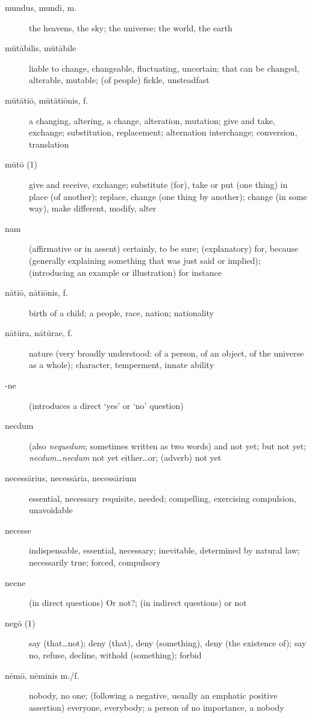 \begin{description}
    \item[mundus, mundī, m.] \marginnote{*}the heavens, the sky; the universe; the world, the earth
    \item[mūtābilis, mūtābile] liable to change, changeable, fluctuating, uncertain; that can be changed, alterable, mutable; (of people) fickle, unsteadfast
    \item[mūtātiō, mūtātiōnis, f.] a changing, altering, a change, alteration, mutation; give and take, exchange; substitution, replacement; alternation interchange; conversion, translation
    \item[mūtō (1)] \marginnote{*}give and receive, exchange; substitute (for), take or put (one thing) in place (of another); replace, change (one thing by another); change (in some way), make different, modify, alter
    \item[nam] \marginnote{*}(affirmative or in assent) certainly, to be sure; (explanatory) for, because (generally explaining something that was just said or implied); (introducing an example or illustration) for instance
    \item[nātiō, nātiōnis, f.] birth of a child; a people, race, nation; nationality
    \item[nātūra, nātūrae, f.] \marginnote{*}nature (very broadly understood: of a person, of an object, of the universe as a whole); character, temperment, innate ability
    \item[-ne] \marginnote{*}(introduces a direct `yes' or `no' question)
    \item[necdum] (also \textit{nequedum}; sometimes written as two words) and not yet; but not yet; \textit{necdum\dots necdum} not yet either\dots or; (adverb) not yet
    \item[necessārius, necessāria, necessārium] essential, necessary requisite, needed; compelling, exercising compulsion, unavoidable
    \item[necesse] \marginnote{*}indispensable, essential, necessary; inevitable, determined by natural law; necessarily true; forced, compulsory
    \item[necne] (in direct questions) Or not?; (in indirect questions) or not
    \item[negō (1)] \marginnote{*}say (that\dots not); deny (that), deny (something), deny (the existence of); say no, refuse, decline, withold (something); forbid
    \item[nēmō, nēminis m./f.] \marginnote{*}nobody,  no one; (following a negative, usually an emphatic positive assertion) everyone, everybody; a person of no importance, a nobody

\end{description}
